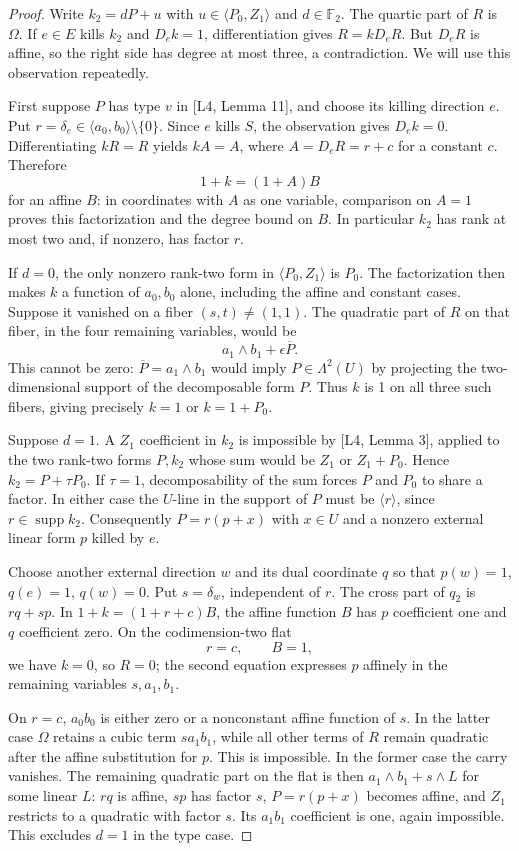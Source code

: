 \documentclass[11pt,a4paper]{article}
\newcommand{\F}{\mathbb F_2}
\newcommand{\supp}{\operatorname{supp}}
\begin{document}
\begin{proof}
Write $k_2=dP+u$ with $u\in\langle P_0,Z_1\rangle$ and $d\in\F$. The quartic part of $R$ is $\Omega$. If $e\in E$ kills $k_2$ and $D_ek=1$, differentiation gives $R=kD_eR$. But $D_eR$ is affine, so the right side has degree at most three, a contradiction. We will use this observation repeatedly.

First suppose $P$ has type $v$ in [L4, Lemma 11], and choose its killing direction $e$. Put $r=\delta_e\in\langle a_0,b_0\rangle\setminus\{0\}$. Since $e$ kills $S$, the observation gives $D_ek=0$. Differentiating $kR=R$ yields $kA=A$, where $A=D_eR=r+c$ for a constant $c$. Therefore
\[
1+k=(1+A)B
\]
for an affine $B$: in coordinates with $A$ as one variable, comparison on $A=1$ proves this factorization and the degree bound on $B$. In particular $k_2$ has rank at most two and, if nonzero, has factor $r$.

If $d=0$, the only nonzero rank-two form in $\langle P_0,Z_1\rangle$ is $P_0$. The factorization then makes $k$ a function of $a_0,b_0$ alone, including the affine and constant cases. Suppose it vanished on a fiber $(s,t)\ne(1,1)$. The quadratic part of $R$ on that fiber, in the four remaining variables, would be
\[
a_1\wedge b_1+\epsilon\overline P.
\]
This cannot be zero: $\overline P=a_1\wedge b_1$ would imply $P\in\Lambda^2(U)$ by projecting the two-dimensional support of the decomposable form $P$. Thus $k$ is 1 on all three such fibers, giving precisely $k=1$ or $k=1+P_0$.

Suppose $d=1$. A $Z_1$ coefficient in $k_2$ is impossible by [L4, Lemma 3], applied to the two rank-two forms $P,k_2$ whose sum would be $Z_1$ or $Z_1+P_0$. Hence $k_2=P+\tau P_0$. If $\tau=1$, decomposability of the sum forces $P$ and $P_0$ to share a factor. In either case the $U$-line in the support of $P$ must be $\langle r\rangle$, since $r\in\supp k_2$. Consequently $P=r(p+x)$ with $x\in U$ and a nonzero external linear form $p$ killed by $e$.

Choose another external direction $w$ and its dual coordinate $q$ so that $p(w)=1$, $q(e)=1$, $q(w)=0$. Put $s=\delta_w$, independent of $r$. The cross part of $q_2$ is $rq+sp$. In $1+k=(1+r+c)B$, the affine function $B$ has $p$ coefficient one and $q$ coefficient zero. On the codimension-two flat
\[
r=c,\qquad B=1,
\]
we have $k=0$, so $R=0$; the second equation expresses $p$ affinely in the remaining variables $s,a_1,b_1$.

On $r=c$, $a_0b_0$ is either zero or a nonconstant affine function of $s$. In the latter case $\Omega$ retains a cubic term $sa_1b_1$, while all other terms of $R$ remain quadratic after the affine substitution for $p$. This is impossible. In the former case the carry vanishes. The remaining quadratic part on the flat is then $a_1\wedge b_1+s\wedge L$ for some linear $L$: $rq$ is affine, $sp$ has factor $s$, $P=r(p+x)$ becomes affine, and $Z_1$ restricts to a quadratic with factor $s$. Its $a_1b_1$ coefficient is one, again impossible. This excludes $d=1$ in the type case.


\end{proof}
\end{document}
